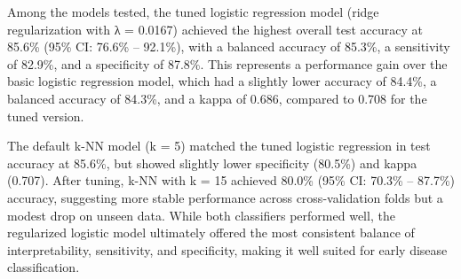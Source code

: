 \documentclass[
]{article}
\begin{document}
Among the models tested, the tuned logistic regression model (ridge
regularization with λ = 0.0167) achieved the highest overall test
accuracy at 85.6\% (95\% CI: 76.6\% -- 92.1\%), with a balanced accuracy
of 85.3\%, a sensitivity of 82.9\%, and a specificity of 87.8\%. This
represents a performance gain over the basic logistic regression model,
which had a slightly lower accuracy of 84.4\%, a balanced accuracy of
84.3\%, and a kappa of 0.686, compared to 0.708 for the tuned version.

The default k-NN model (k = 5) matched the tuned logistic regression in
test accuracy at 85.6\%, but showed slightly lower specificity (80.5\%)
and kappa (0.707). After tuning, k-NN with k = 15 achieved 80.0\% (95\%
CI: 70.3\% -- 87.7\%) accuracy, suggesting more stable performance
across cross-validation folds but a modest drop on unseen data. While
both classifiers performed well, the regularized logistic model
ultimately offered the most consistent balance of interpretability,
sensitivity, and specificity, making it well suited for early disease
classification.
\end{document}
